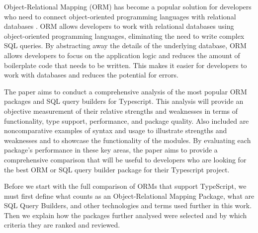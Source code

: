 Object-Relational Mapping (ORM) has become a popular solution for developers who
need to connect object-oriented programming languages with relational databases
\cite{Torres_Galante_Pimenta_Martins_2017}. ORM allows developers to work with
relational databases using object-oriented programming languages, eliminating
the need to write complex SQL queries. By abstracting away the details of the
underlying database, ORM allows developers to focus on the application logic and
reduces the amount of boilerplate code that needs to be written. This makes it
easier for developers to work with databases and reduces the potential for
errors. 

The paper aims to conduct a comprehensive analysis of the most popular ORM
packages and SQL query builders for Typescript. This analysis will provide an
objective measurement of their relative strengths and weaknesses in terms of
functionality, type support, performance, and package quality. Also included are
noncomparative examples of syntax and usage to illustrate strengths and
weaknesses and to showcase the functionality of the modules. By evaluating each
package's performance in these key areas, the paper aims to provide a
comprehensive comparison that will be useful to developers who are looking for
the best ORM or SQL query builder package for their Typescript project.

Before we start with the full comparison of ORMs that support TypeScript, we
must first define what counts as an Object-Relational Mapping Package, what are
SQL Query Builders, and other technologies and terms used further in this work.
Then we explain how the packages further analysed were selected and by which
criteria they are ranked and reviewed.

